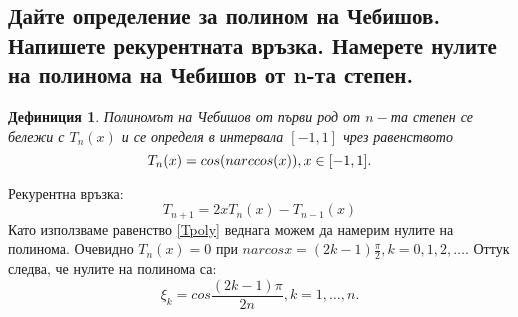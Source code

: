 \documentclass[12pt]{article}
\numberwithin{equation}{subsection}
\newtheorem{definition}{Дефиниция}
\numberwithin{theorem}{subsection}
\numberwithin{definition}{subsection}
\numberwithin{corollary}{subsection}
\begin{document}
\subsection{Дайте определение за полином на Чебишов. Напишете рекурентната връзка. Намерете нулите на полинома на Чебишов от n-та степен.}
  \begin{definition}Полиномът на Чебишов от първи род от $n-$та степен се бележи с $T_n(x)$ и се определя в интервала $[-1,1]$ чрез равенството 
  \begin{equation}\label{Tpoly}
    T_n(x)=cos(narccos(x)), \hfill x\in[-1,1].
  \end{equation}
  \end{definition}
  Рекурентна връзка:
  \begin{equation}\label{recTpoly}
    T_{n+1}=2xT_n(x)-T_{n-1}(x)
  \end{equation}
  Като използваме равенство \ref{Tpoly} веднага можем да намерим нулите на полинома. Очевидно $T_n(x)=0$ при $narcosx=(2k-1)\frac{\pi}{2}, k=0,1,2,\ldots$. Оттук следва, че нулите на полинома са:
  \begin{equation*}
    \xi_k=cos\frac{(2k-1)\pi}{2n}, k=1,\ldots,n.
  \end{equation*}
\end{document}
